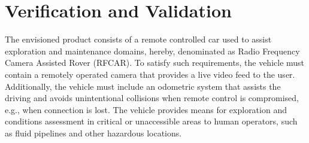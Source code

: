 \chapter{Verification and Validation}%
\label{ch:verif-valid}
The envisioned product consists of a remote controlled car used to assist
exploration and maintenance domains, hereby, denominated as Radio Frequency
Camera Assisted Rover (RFCAR). To satisfy such requirements, the vehicle must
contain a remotely operated camera that provides a live video feed to the user.
Additionally, the vehicle must include an odometric system that assists the
driving and avoids unintentional collisions when remote control is compromised, e.g., when connection is lost.
The vehicle provides means for exploration and conditions assessment in critical
or unaccessible areas to human operators, such as fluid pipelines and other
hazardous locations.
%

